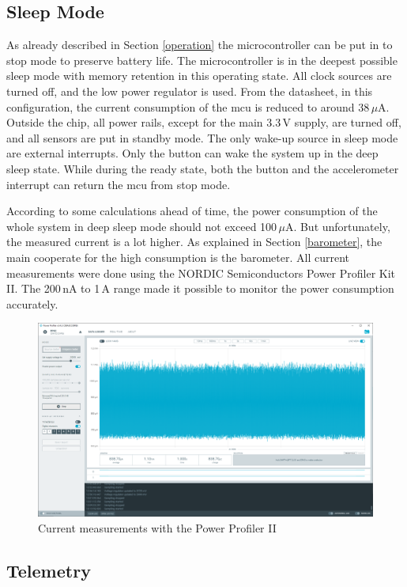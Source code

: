 \subsection{Sleep Mode}
As already described in Section \ref{operation} the microcontroller can be put in to stop mode to preserve battery life. The microcontroller is in the deepest possible sleep mode with memory retention in this operating state. All clock sources are turned off, and the low power regulator is used. From the datasheet, in this configuration, the current consumption of the \acrshort{mcu} is reduced to around 38\,$\mu$A. Outside the chip, all power rails, except for the main 3.3\,V supply, are turned off, and all sensors are put in standby mode. The only wake-up source in sleep mode are external interrupts. Only the button can wake the system up in the deep sleep state. While during the ready state, both the button and the accelerometer interrupt can return the \acrshort{mcu} from stop mode.  

According to some calculations ahead of time, the power consumption of the whole system in deep sleep mode should not exceed 100\,$\mu$A. But unfortunately, the measured current is a lot higher. As explained in Section \ref{barometer}, the main cooperate for the high consumption is the barometer. All current measurements were done using the NORDIC Semiconductors Power Profiler Kit II. The 200\,nA to 1\,A range made it possible to monitor the power consumption accurately.  

\begin{figure}[h!]
	\includegraphics[width=\textwidth]{images/current}
	\caption{Current measurements with the Power Profiler II}
	\label{fig:current}
\end{figure}

\subsection{Telemetry}

